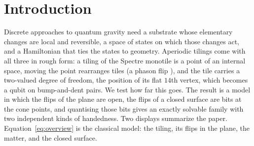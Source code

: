 \documentclass[11pt]{article}
\theoremstyle{definition}
\begin{document}
\section{Introduction}\label{sec:intro}
Discrete approaches to quantum gravity need a substrate whose elementary changes are local and reversible, a space of states on which those changes act, and a Hamiltonian that ties the states to geometry. Aperiodic tilings come with all three in rough form: a tiling of the Spectre monotile \cite{smith2023} is a point of an internal space, moving the point rearranges tiles (a phason flip \cite{socolar1986}), and the tile carries a two-valued degree of freedom, the position of its flat $14$th vertex, which becomes a qubit on bump-and-dent pairs. We test how far this goes. The result is a model in which the flips of the plane are open, the flips of a closed surface are bits at the cone points, and quantising those bits gives an exactly solvable family with two independent kinds of handedness. Two displays summarize the paper. Equation~\eqref{eq:overview} is the classical model: the tiling, its flips in the plane, the matter, and the closed surface.
\end{document}
